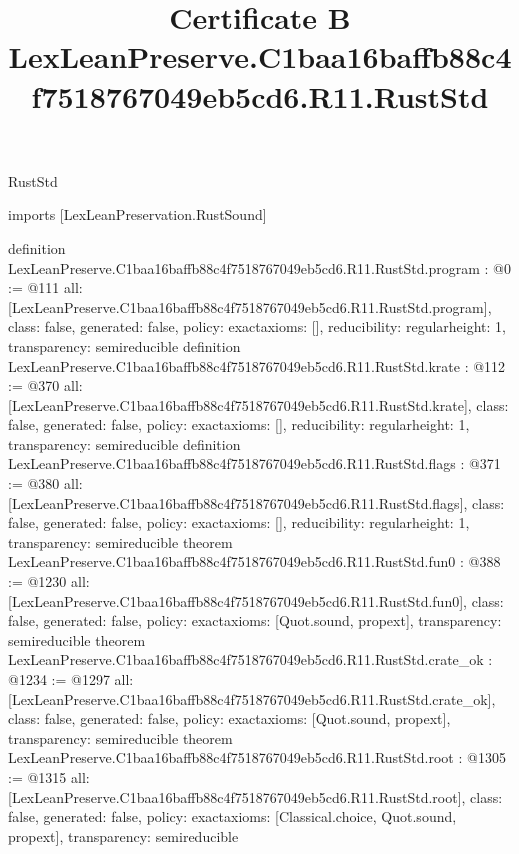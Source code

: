 \begin{lexlean}{RustStd}
\title{Certificate B LexLeanPreserve.C1baa16baffb88c4f7518767049eb5cd6.R11.RustStd}
\begin{coremodule}
imports [LexLeanPreservation.RustSound]

definition LexLeanPreserve.C1baa16baffb88c4f7518767049eb5cd6.R11.RustStd.program : @0 := @111 {
  all: [LexLeanPreserve.C1baa16baffb88c4f7518767049eb5cd6.R11.RustStd.program],
  class: false,
  generated: false,
  policy: exact{axioms: []},
  reducibility: regular{height: 1},
  transparency: semireducible
}
definition LexLeanPreserve.C1baa16baffb88c4f7518767049eb5cd6.R11.RustStd.krate : @112 := @370 {
  all: [LexLeanPreserve.C1baa16baffb88c4f7518767049eb5cd6.R11.RustStd.krate],
  class: false,
  generated: false,
  policy: exact{axioms: []},
  reducibility: regular{height: 1},
  transparency: semireducible
}
definition LexLeanPreserve.C1baa16baffb88c4f7518767049eb5cd6.R11.RustStd.flags : @371 := @380 {
  all: [LexLeanPreserve.C1baa16baffb88c4f7518767049eb5cd6.R11.RustStd.flags],
  class: false,
  generated: false,
  policy: exact{axioms: []},
  reducibility: regular{height: 1},
  transparency: semireducible
}
theorem LexLeanPreserve.C1baa16baffb88c4f7518767049eb5cd6.R11.RustStd.fun0 : @388 := @1230 {
  all: [LexLeanPreserve.C1baa16baffb88c4f7518767049eb5cd6.R11.RustStd.fun0],
  class: false,
  generated: false,
  policy: exact{axioms: [Quot.sound, propext]},
  transparency: semireducible
}
theorem LexLeanPreserve.C1baa16baffb88c4f7518767049eb5cd6.R11.RustStd.crate_ok : @1234 := @1297 {
  all: [LexLeanPreserve.C1baa16baffb88c4f7518767049eb5cd6.R11.RustStd.crate_ok],
  class: false,
  generated: false,
  policy: exact{axioms: [Quot.sound, propext]},
  transparency: semireducible
}
theorem LexLeanPreserve.C1baa16baffb88c4f7518767049eb5cd6.R11.RustStd.root : @1305 := @1315 {
  all: [LexLeanPreserve.C1baa16baffb88c4f7518767049eb5cd6.R11.RustStd.root],
  class: false,
  generated: false,
  policy: exact{axioms: [Classical.choice, Quot.sound, propext]},
  transparency: semireducible
}


\end{coremodule}
\end{lexlean}
